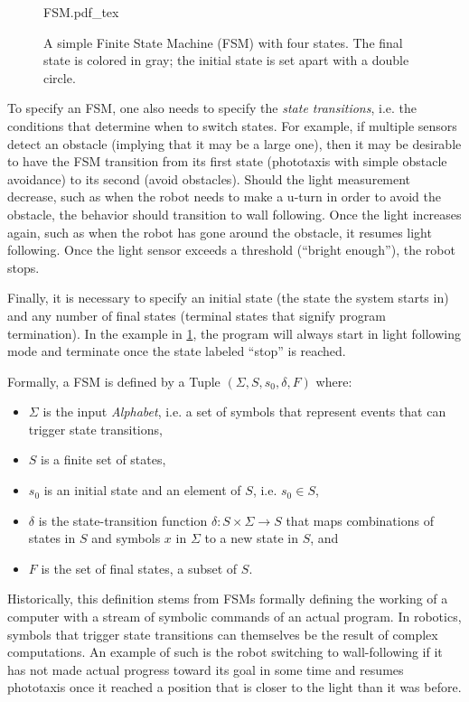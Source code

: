 \begin{figure}
\centering
    \small
    \def\svgwidth{0.9\textwidth}
    {FSM.pdf_tex}
\caption{A simple Finite State Machine (FSM) with four states. The final state is colored in gray; the initial state is set apart with a double circle.\label{fig:fsm}}
\end{figure}

To specify an FSM, one also needs to specify the \textsl{state transitions}, i.e. the conditions that determine when to switch states. For example, if multiple sensors detect an obstacle (implying that it may be a large one), then it may be desirable to have the FSM transition from its first state (phototaxis with simple obstacle avoidance) to its second (avoid obstacles). Should the light measurement decrease, such as when the robot needs to make a u-turn in order to avoid the obstacle, the behavior should transition to wall following. Once the light increases again, such as when the robot has gone around the obstacle, it resumes light following. Once the light sensor exceeds a threshold (``bright enough''), the robot stops.

Finally, it is necessary to specify an initial state (the state the system starts in) and any number of final states (terminal states that signify program termination). In the example in \cref{fig:fsm}, the program will always start in light following mode and terminate once the state labeled ``stop'' is reached.

Formally, a FSM is defined by a Tuple $(\Sigma, S, s_0, \delta, F)$ where:
\begin{itemize}
\item $\Sigma$ is the input \textsl{Alphabet}, i.e. a set of symbols that represent events that can trigger state transitions,
\item $S$ is a finite set of states,
\item $s_0$ is an initial state and an element of $S$, i.e. $s_0 \in S$,
\item $\delta$ is the state-transition function $\delta: S \times \Sigma \rightarrow S$ that maps combinations of states in $S$ and symbols $x$ in $\Sigma$ to a new state in $S$, and
\item $F$ is the set of final states, a subset of $S$.
\end{itemize}

Historically, this definition stems from FSMs formally defining the working of a computer with a stream of symbolic commands of an actual program. In robotics, symbols that trigger state transitions can themselves be the result of complex computations. An example of such is the robot switching to wall-following if it has not made actual progress toward its goal in some time and resumes phototaxis once it reached a position that is closer to the light than it was before.

